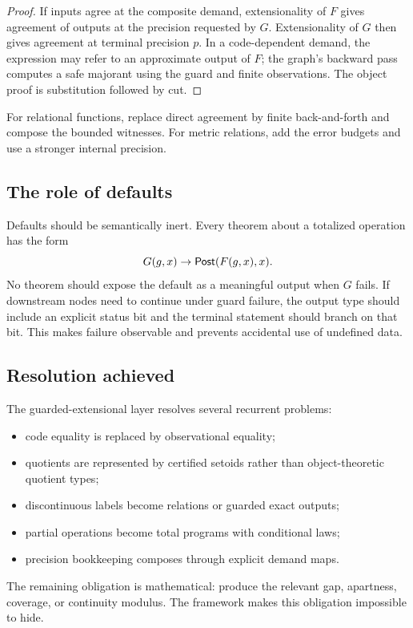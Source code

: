 \begin{proof}
If inputs agree at the composite demand, extensionality of \(F\) gives agreement of outputs at the precision requested by \(G\).  Extensionality of \(G\) then gives agreement at terminal precision \(p\).  In a code-dependent demand, the expression may refer to an approximate output of \(F\); the graph's backward pass computes a safe majorant using the guard and finite observations.  The object proof is substitution followed by cut.
\end{proof}

For relational functions, replace direct agreement by finite back-and-forth and compose the bounded witnesses.  For metric relations, add the error budgets and use a stronger internal precision.

\subsection{The role of defaults}

Defaults should be semantically inert.  Every theorem about a totalized operation has the form
\[
 G(g,x)\to \mathsf{Post}(F(g,x),x).
\]
No theorem should expose the default as a meaningful output when \(G\) fails.  If downstream nodes need to continue under guard failure, the output type should include an explicit status bit and the terminal statement should branch on that bit.  This makes failure observable and prevents accidental use of undefined data.

\subsection{Resolution achieved}

The guarded-extensional layer resolves several recurrent problems:

\begin{itemize}
\item code equality is replaced by observational equality;
\item quotients are represented by certified setoids rather than object-theoretic quotient types;
\item discontinuous labels become relations or guarded exact outputs;
\item partial operations become total programs with conditional laws;
\item precision bookkeeping composes through explicit demand maps.
\end{itemize}

The remaining obligation is mathematical: produce the relevant gap, apartness, coverage, or continuity modulus.  The framework makes this obligation impossible to hide.
